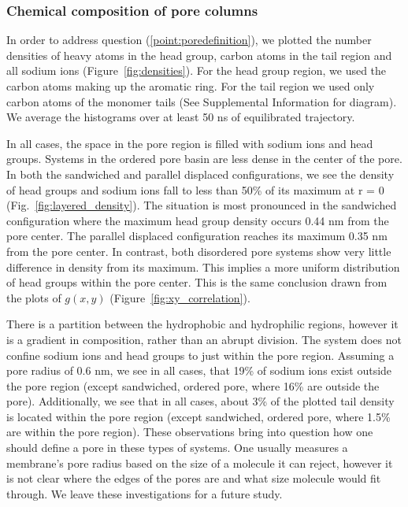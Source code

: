 \documentclass[journal=jpcbfk,manusciprt=article]{achemso}
\begin{document}
  \subsubsection{Chemical composition of pore columns}

  In order to address question (\ref{point:poredefinition}), we plotted the
  number densities of heavy atoms in the head group, carbon atoms in the tail
  region and all sodium ions (Figure~\ref{fig:densities}). For the head group
  region, we used the carbon atoms making up the aromatic ring. For the tail
  region we used only carbon atoms of the monomer tails (See Supplemental
  Information for diagram). We average the histograms over at least 50 ns of
  equilibrated trajectory.
  
  In all cases, the space in the pore region is filled with sodium ions and
  head groups. Systems in the ordered pore basin are less dense in
  the center of the pore. In both the sandwiched and parallel displaced
  configurations, we see the density of head groups and sodium ions fall to less
  than 50\% of its maximum at r = 0 (Fig.~\ref{fig:layered_density}). The
  situation is most pronounced in the sandwiched configuration where the maximum
  head group density occurs 0.44 nm from the pore center. The parallel displaced
  configuration reaches its maximum 0.35 nm from the pore center. In contrast,
  both disordered pore systems show very little difference in density from its
  maximum. This implies a more uniform distribution of head groups within the
  pore center. This is the same conclusion drawn from the plots of $g(x,y)$ 
  (Figure~\ref{fig:xy_correlation}). 

  There is a partition between the hydrophobic and hydrophilic regions, however
  it is a gradient in composition, rather than an abrupt division. The system
  does not confine sodium ions and head groups to just within the pore region.
  Assuming a pore radius of 0.6 nm, we see in all cases, that 19\% of sodium ions
  exist outside the pore region (except sandwiched, ordered pore, where 16\%
  are outside the pore). Additionally, we see that in all cases, about 3\% of the
  plotted tail density is located within the pore region (except sandwiched,
  ordered pore, where 1.5\% are within the pore region). These observations bring
  into question how one should define a pore in these types of systems. One
  usually measures a membrane's pore radius based on the size of a molecule it
  can reject, however it is not clear where the edges of the pores are and what
  size molecule would fit through. We leave these investigations for a future
  study.
\end{document}
